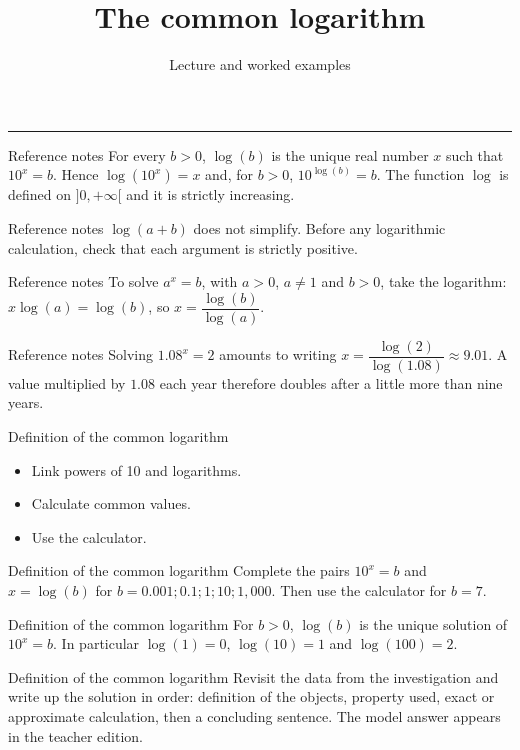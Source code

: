 \documentclass[aspectratio=169,10pt]{beamer}
\title{The common logarithm}
\subtitle{Lecture and worked examples}
\date{}
\author{}
\begin{document}
\begin{frame}[plain]
\vfill
{\inserttitle\par}
\medskip
{\insertsubtitle\par}
\medskip
{\rule{\textwidth}{.5pt}}
\vfill
\end{frame}
\begin{frame}{Reference notes}
For every \(b>0\), \(\log(b)\) is the unique real number \(x\) such that \(10^x=b\). Hence \(\log(10^x)=x\) and, for \(b>0\), \(10^{\log(b)}=b\). The function \(\log\) is defined on \(]0,+\infty[\) and it is strictly increasing.
\end{frame}
\begin{frame}{Reference notes}
\(\log(a+b)\) does not simplify. Before any logarithmic calculation, check that each argument is strictly positive.
\end{frame}
\begin{frame}{Reference notes}
To solve \(a^x=b\), with \(a>0\), \(a\neq1\) and \(b>0\), take the logarithm: \(x\log(a)=\log(b)\), so \(x=\dfrac{\log(b)}{\log(a)}\).
\end{frame}
\begin{frame}{Reference notes}
Solving \(1.08^x=2\) amounts to writing \(x=\dfrac{\log(2)}{\log(1.08)}\approx9.01\). A value multiplied by \(1.08\) each year therefore doubles after a little more than nine years.
\end{frame}
\begin{frame}{Definition of the common logarithm}
\begin{itemize}
\item Link powers of 10 and logarithms.
\item Calculate common values.
\item Use the calculator.

\end{itemize}
\end{frame}
\begin{frame}{Definition of the common logarithm}
Complete the pairs \(10^x=b\) and \(x=\log(b)\) for \(b=0.001;0.1;1;10;1{,}000\). Then use the calculator for \(b=7\).
\end{frame}
\begin{frame}{Definition of the common logarithm}
For \(b>0\), \(\log(b)\) is the unique solution of \(10^x=b\). In particular \(\log(1)=0\), \(\log(10)=1\) and \(\log(100)=2\).
\end{frame}
\begin{frame}{Definition of the common logarithm}
Revisit the data from the investigation and write up the solution in order: definition of the objects, property used, exact or approximate calculation, then a concluding sentence. The model answer appears in the teacher edition.
\end{frame}
\end{document}
